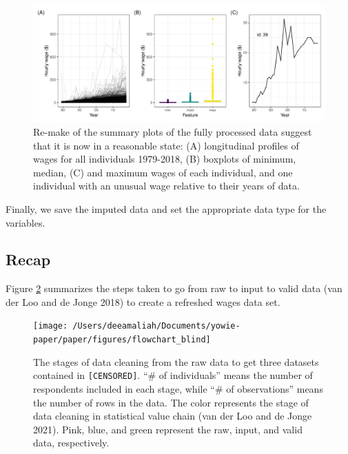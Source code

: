 \documentclass{article}
\begin{document}
\begin{figure}

{\centering \includegraphics[width=1\linewidth]{figures/fixed-feature-plot-1} 

}

\caption{Re-make of the summary plots of the fully processed data suggest that it is now in a reasonable state: (A) longitudinal profiles of wages for all individuals 1979-2018, (B) boxplots of minimum, median, (C) and maximum wages of each individual, and one individual with an unusual wage relative to their years of data. }\label{fig:fixed-feature-plot}
\end{figure}

Finally, we save the imputed data and set the appropriate data type for the variables.

\hypertarget{recap}{%
\subsection{Recap}\label{recap}}

Figure \ref{fig:flow-chart-blind} summarizes the steps taken to go from raw to input to valid data (van der Loo and de Jonge 2018) to create a refreshed wages data set.



\begin{figure}

{\centering \texttt{[image: /Users/deeamaliah/Documents/yowie-paper/paper/figures/flowchart\_blind]} 

}

\caption{The stages of data cleaning from the raw data to get three datasets contained in \texttt{[CENSORED]}. ``\# of individuals'' means the number of respondents included in each stage, while ``\# of observations'' means the number of rows in the data. The color represents the stage of data cleaning in statistical value chain (van der Loo and de Jonge 2021). Pink, blue, and green represent the raw, input, and valid data, respectively.}\label{fig:flow-chart-blind}
\end{figure}
\end{document}
